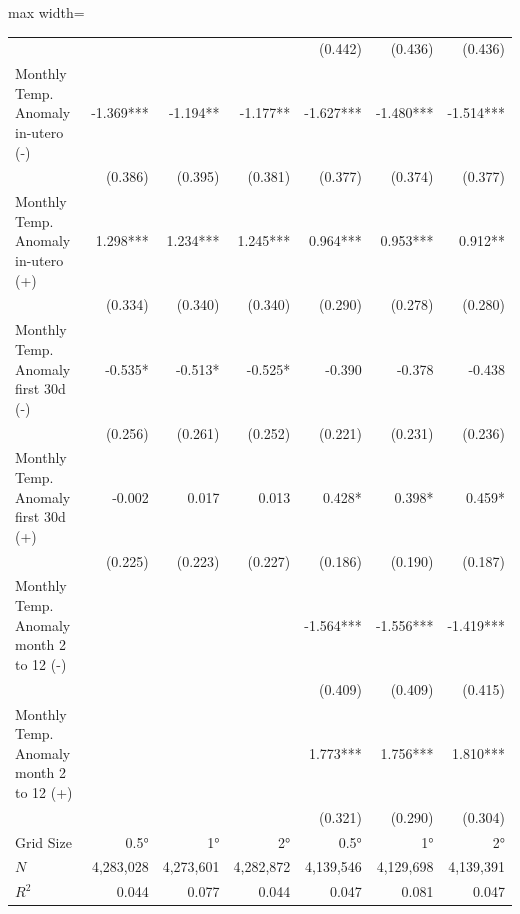 \begin{table}[H]
\begin{adjustbox}{max width=\linewidth}
\begin{tabular}{lrrrrrr}
                                            &             &             &              &    (0.442)   &    (0.436)   &   (0.436)    \\ 
Monthly Temp. Anomaly in-utero   (-)        &  -1.369***  &   -1.194**  &   -1.177**   &  -1.627***   &  -1.480***   & -1.514***    \\
                                            &    (0.386)  &    (0.395)  &    (0.381)   &    (0.377)   &    (0.374)   &   (0.377)    \\
Monthly Temp. Anomaly in-utero  (+)         &   1.298***  &   1.234***  &   1.245***   &   0.964***   &   0.953***   &   0.912**    \\
                                            &    (0.334)  &    (0.340)  &    (0.340)   &    (0.290)   &    (0.278)   &   (0.280)    \\
Monthly Temp. Anomaly first 30d   (-)       &    -0.535*  &    -0.513*  &    -0.525*   &     -0.390   &     -0.378   &    -0.438    \\
                                            &    (0.256)  &    (0.261)  &    (0.252)   &    (0.221)   &    (0.231)   &   (0.236)    \\
Monthly Temp. Anomaly first 30d (+)         &     -0.002  &      0.017  &      0.013   &     0.428*   &     0.398*   &    0.459*    \\
                                            &    (0.225)  &    (0.223)  &    (0.227)   &    (0.186)   &    (0.190)   &   (0.187)    \\
Monthly Temp. Anomaly month 2 to 12 (-)     &             &             &              &  -1.564***   &  -1.556***   & -1.419***    \\ 
                                            &             &             &              &    (0.409)   &    (0.409)   &   (0.415)    \\ 
Monthly Temp. Anomaly month 2 to 12 (+)     &             &             &              &   1.773***   &   1.756***   &  1.810***    \\ 
                                            &             &             &              &    (0.321)   &    (0.290)   &   (0.304)    \\ 
\midrule
Grid Size                                   &       0.5°  &      1°     &      2°      &      0.5°    &     1°       &          2°  \\ 
$N$                                         &  4,283,028  &  4,273,601  &  4,282,872   &   4,139,546  &  4,129,698   &    4,139,391 \\ 
$R^2$                                       &      0.044  &      0.077  &      0.044   &       0.047  &      0.081   &        0.047 \\ 
\bottomrule
\end{tabular}
\end{adjustbox}
\end{table}